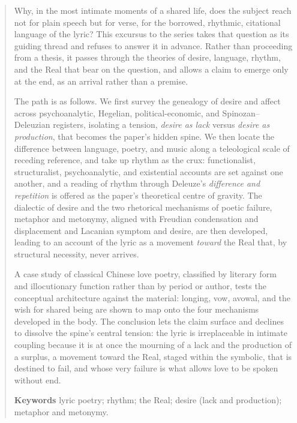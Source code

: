 
\begin{abstract}
\noindent
Why, in the most intimate moments of a shared life, does the subject reach not for plain speech but for verse, for the borrowed, rhythmic, citational language of the lyric? This excursus to the series takes that question as its guiding thread and refuses to answer it in advance. Rather than proceeding from a thesis, it passes through the theories of desire, language, rhythm, and the Real that bear on the question, and allows a claim to emerge only at the end, as an arrival rather than a premise.

\smallskip
\noindent The path is as follows. We first survey the genealogy of desire and affect across psychoanalytic, Hegelian, political-economic, and Spinozan--Deleuzian registers, isolating a tension, \emph{desire as lack} versus \emph{desire as production}, that becomes the paper's hidden spine. We then locate the difference between language, poetry, and music along a teleological scale of receding reference, and take up rhythm as the crux: functionalist, structuralist, psychoanalytic, and existential accounts are set against one another, and a reading of rhythm through Deleuze's \emph{difference and repetition} is offered as the paper's theoretical centre of gravity. The dialectic of desire and the two rhetorical mechanisms of poetic failure, metaphor and metonymy, aligned with Freudian condensation and displacement and Lacanian symptom and desire, are then developed, leading to an account of the lyric as a movement \emph{toward} the Real that, by structural necessity, never arrives.

\smallskip
\noindent A case study of classical Chinese love poetry, classified by literary form and illocutionary function rather than by period or author, tests the conceptual architecture against the material: longing, vow, avowal, and the wish for shared being are shown to map onto the four mechanisms developed in the body. The conclusion lets the claim surface and declines to dissolve the spine's central tension: the lyric is irreplaceable in intimate coupling because it is at once the mourning of a lack and the production of a surplus, a movement toward the Real, staged within the symbolic, that is destined to fail, and whose very failure is what allows love to be spoken without end.

\vspace{0.6em}
\noindent\textbf{Keywords}\quad
lyric poetry; rhythm; the Real; desire (lack and production); metaphor and metonymy.
\end{abstract}
\clearpage

